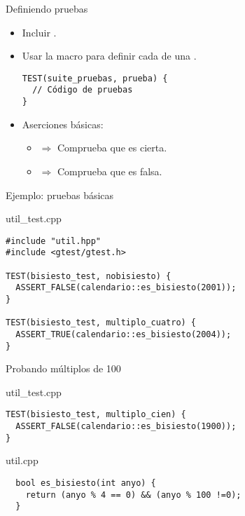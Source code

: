 \begin{frame}[t,fragile]{Definiendo pruebas}
\begin{itemize}
  \item Incluir .

  \item Usar la macro  para definir cada  de una
        .
\begin{lstlisting}
TEST(suite_pruebas, prueba) {
  // Código de pruebas
}
\end{lstlisting}

  \item Aserciones básicas:
    \begin{itemize}
      \item {} $\Rightarrow$ 
            Comprueba que  es cierta.
      \item {} $\Rightarrow$ 
            Comprueba que  es falsa.
    \end{itemize}

\end{itemize}
\end{frame}

\begin{frame}[t,fragile]{Ejemplo: pruebas básicas}
\begin{block}{util\_test.cpp}
\begin{lstlisting}
#include "util.hpp"
#include <gtest/gtest.h>

TEST(bisiesto_test, nobisiesto) {
  ASSERT_FALSE(calendario::es_bisiesto(2001));
}

TEST(bisiesto_test, multiplo_cuatro) {
  ASSERT_TRUE(calendario::es_bisiesto(2004));
}
\end{lstlisting}
\end{block}
\end{frame}

\begin{frame}[t,fragile]{Probando múltiplos de 100}
\begin{block}{util\_test.cpp}
\begin{lstlisting}
TEST(bisiesto_test, multiplo_cien) {
  ASSERT_FALSE(calendario::es_bisiesto(1900));
}
\end{lstlisting}
\end{block}

\begin{block}{util.cpp}
\begin{lstlisting}
  bool es_bisiesto(int anyo) {
    return (anyo % 4 == 0) && (anyo % 100 !=0);
  }
\end{lstlisting}
\end{block}
\end{frame}

